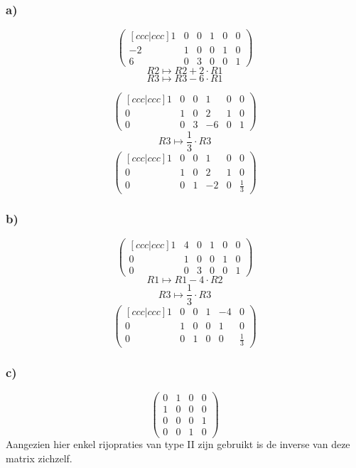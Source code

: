\documentclass[10pt,a4paper]{article}
\begin{document}
\subsubsection*{a)}
$$
\begin{pmatrix}[ccc|ccc]
 1 & 0 & 0 & 1 & 0 & 0\\
-2 & 1 & 0 & 0 & 1 & 0\\ 
 6 & 0 & 3 & 0 & 0 & 1 
\end{pmatrix}
$$
$$R2 \longmapsto R2 + 2\cdot R1$$
$$R3 \longmapsto R3 - 6\cdot R1$$

$$
\begin{pmatrix}[ccc|ccc]
 1 & 0 & 0 & 1 & 0 & 0\\
 0 & 1 & 0 & 2 & 1 & 0\\ 
 0 & 0 & 3 & -6 & 0 & 1 
\end{pmatrix}
$$
$$R3 \longmapsto \frac{1}{3}\cdot R3$$
$$
\begin{pmatrix}[ccc|ccc]
 1 & 0 & 0 & 1 & 0 & 0\\
 0 & 1 & 0 & 2 & 1 & 0\\ 
 0 & 0 & 1 & -2 & 0 & \frac{1}{3} 
\end{pmatrix}
$$
\subsubsection*{b)}

$$
\begin{pmatrix}[ccc|ccc]
1 & 4 & 0 & 1 & 0 & 0\\
0 & 1 & 0 & 0 & 1 & 0\\
0 & 0 & 3 & 0 & 0 & 1
\end{pmatrix}
$$
$$R1 \longmapsto R1 - 4\cdot R2$$
$$R3 \longmapsto \frac{1}{3}\cdot R3$$
$$
\begin{pmatrix}[ccc|ccc]
1 & 0 & 0 & 1 & -4 & 0\\
0 & 1 & 0 & 0 & 1 & 0\\
0 & 0 & 1 & 0 & 0 & \frac{1}{3}
\end{pmatrix}
$$

\subsubsection*{c)}
$$
\begin{pmatrix}
0 & 1 & 0 & 0\\
1 & 0 & 0 & 0\\
0 & 0 & 0 & 1\\
0 & 0 & 1 & 0
\end{pmatrix}
$$
Aangezien hier enkel rijopraties van type II zijn gebruikt is de inverse van deze matrix zichzelf.
\end{document}
